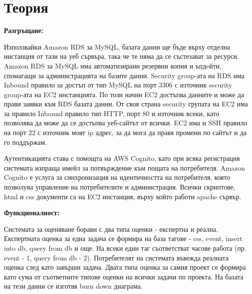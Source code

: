 \documentclass[12pt]{article}
\begin{document}
\section{Теория}

\textbf{Разгръщане:}\medskip

Използвайки Amazon RDS за MySQL, базата данни ще бъде върху отделна инстанция от тази на уеб сървъра, така че те няма да се състезават за ресурси. Amazon RDS за MySQL има автоматизирани резервни копия и ъпдeйти, спомагащи за администрацията на базите данни.
Security group-ата на RDS има Inbound правило за достъп от тип MySQL на порт 3306 с източник security group-ата на EC2 инстанцията. По този начин EC2 достъпва данните и може да прави заявки към RDS базата данни. От своя страна security групата на EC2 има за правило Inbound правило тип HTTP, порт 80 и източник всеки, като позволява да може да се достъпва уеб-сайтът от всички. EC2 има и SSH правило на порт 22 с източник моят ip адрес, за да мога да правя промени по сайтът и да го поддържам.\medskip

Аутентикацията става с помощта на AWS Cognito, като при всяка регистрация системата изпраща имейл за потвърждение към пощата на потребителя. Amazon Cognito е услуга за синхронизация на идентичността на потребителя, която позволува управление на потребителите и администрация. 
Всички скриптове, html и css документи са на EC2 инстанция, върху който работи apache сървър.\medskip

 \textbf{Функционалност:}\medskip
 
Системата за оценяване борави с два типа оценки - експертна и реална. Експертната оценка за една задача се формира на база тагове - css, event, insert into db, query from db и още. На всеки един таг съответстват часове работа (пр. event - 1, query from db - 2). Потребителят на системата въвежда реалната оценка след като завърши задача. Двата типа оценка за самия проект се формира като сума от съответните типове оценки на всички задачи по проекта. На базата на тези данни се изготвя burn down диаграма.
\end{document}
